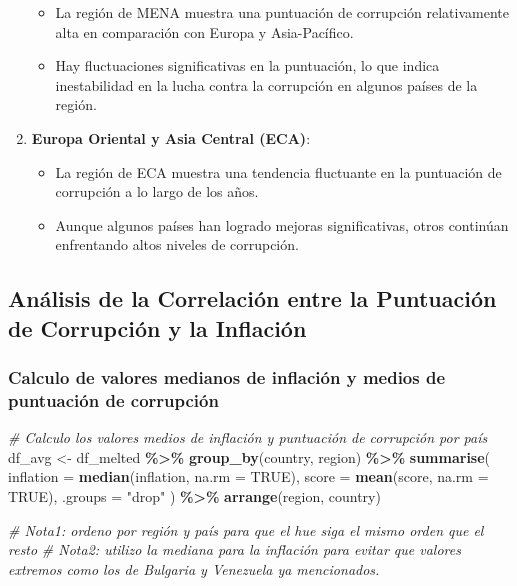 \documentclass[
]{article}
\newenvironment{Shaded}{\begin{snugshade}}{\end{snugshade}}
\newcommand{\AttributeTok}[1]{\textcolor[rgb]{0.13,0.29,0.53}{#1}}
\newcommand{\CommentTok}[1]{\textcolor[rgb]{0.56,0.35,0.01}{\textit{#1}}}
\newcommand{\ConstantTok}[1]{\textcolor[rgb]{0.56,0.35,0.01}{#1}}
\newcommand{\FunctionTok}[1]{\textcolor[rgb]{0.13,0.29,0.53}{\textbf{#1}}}
\newcommand{\NormalTok}[1]{#1}
\newcommand{\OtherTok}[1]{\textcolor[rgb]{0.56,0.35,0.01}{#1}}
\newcommand{\SpecialCharTok}[1]{\textcolor[rgb]{0.81,0.36,0.00}{\textbf{#1}}}
\newcommand{\StringTok}[1]{\textcolor[rgb]{0.31,0.60,0.02}{#1}}
\providecommand{\tightlist}{%
  \setlength{\itemsep}{0pt}\setlength{\parskip}{0pt}}
\begin{document}
\begin{enumerate}
  \begin{itemize}
  \tightlist
  \item
    La región de MENA muestra una puntuación de corrupción relativamente
    alta en comparación con Europa y Asia-Pacífico.
  \item
    Hay fluctuaciones significativas en la puntuación, lo que indica
    inestabilidad en la lucha contra la corrupción en algunos países de
    la región.
  \end{itemize}
\item
  \textbf{Europa Oriental y Asia Central (ECA)}:

  \begin{itemize}
  \tightlist
  \item
    La región de ECA muestra una tendencia fluctuante en la puntuación
    de corrupción a lo largo de los años.
  \item
    Aunque algunos países han logrado mejoras significativas, otros
    continúan enfrentando altos niveles de corrupción.
  \end{itemize}
\end{enumerate}

\subsection{Análisis de la Correlación entre la Puntuación de Corrupción
y la
Inflación}\label{analisis-de-la-correlacion-entre-la-puntuacion-de-corrupcion-y-la-inflacion}

\subsubsection{Calculo de valores medianos de inflación y medios de
puntuación de corrupción}\label{calculo-inflacion-cpi}

\begin{Shaded}
\begin{Highlighting}[]
\CommentTok{\# Calculo los valores medios de inflación y puntuación de corrupción por país}
\NormalTok{df\_avg }\OtherTok{\textless{}{-}}\NormalTok{ df\_melted }\SpecialCharTok{\%\textgreater{}\%}
    \FunctionTok{group\_by}\NormalTok{(country, region) }\SpecialCharTok{\%\textgreater{}\%} 
    \FunctionTok{summarise}\NormalTok{(}
        \AttributeTok{inflation =} \FunctionTok{median}\NormalTok{(inflation, }\AttributeTok{na.rm =} \ConstantTok{TRUE}\NormalTok{),}
        \AttributeTok{score =} \FunctionTok{mean}\NormalTok{(score, }\AttributeTok{na.rm =} \ConstantTok{TRUE}\NormalTok{), }\AttributeTok{.groups =} \StringTok{"drop"}
\NormalTok{    ) }\SpecialCharTok{\%\textgreater{}\%}
    \FunctionTok{arrange}\NormalTok{(region, country)}
    
\CommentTok{\# Nota1: ordeno por región y país para que el hue siga el mismo orden que el resto}
\CommentTok{\# Nota2: utilizo la mediana para la inflación para evitar que valores extremos como los de Bulgaria y Venezuela ya mencionados.}
\end{Highlighting}
\end{Shaded}
\end{document}
